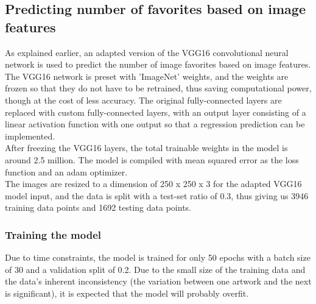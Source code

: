 \documentclass[11pt]{article}
\begin{document}
    \subsection{Predicting number of favorites based on image features}

As explained earlier, an adapted version of the VGG16 convolutional
neural network is used to predict the number of image favorites based on
image features. The VGG16 network is preset with 'ImageNet' weights, and
the weights are frozen so that they do not have to be retrained, thus
saving computational power, though at the cost of less accuracy. The
original fully-connected layers are replaced with custom fully-connected
layers, with an output layer consisting of a linear activation function
with one output so that a regression prediction can be implemented.\\

After freezing the VGG16 layers, the total trainable weights in the
model is around 2.5 million. The model is compiled with mean squared
error as the loss function and an adam optimizer.\\

The images are resized to a dimension of 250 x 250 x 3 for the adapted
VGG16 model input, and the data is split with a test-set ratio of 0.3,
thus giving us 3946 training data points and 1692 testing data points.

\subsubsection{Training the model}

Due to time constraints, the model is trained for only 50 epochs with a
batch size of 30 and a validation split of 0.2. Due to the small size of
the training data and the data's inherent inconsistency (the variation
between one artwork and the next is significant), it is expected that
the model will probably overfit.
\end{document}
